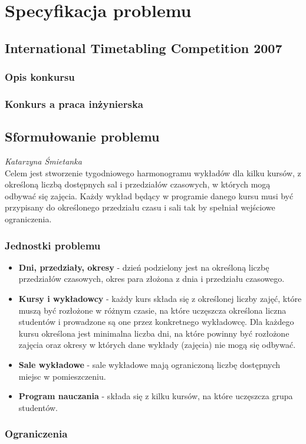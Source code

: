 \chapter{Specyfikacja problemu}
\section{International Timetabling Competition 2007}
\subsection{Opis konkursu}
\subsection{Konkurs a praca inżynierska}
\section{Sformułowanie problemu}
\textit{Katarzyna Śmietanka} \\
Celem jest stworzenie tygodniowego harmonogramu wykładów dla kilku kursów, z określoną liczbą dostępnych sal i przedziałów czasowych, w których mogą odbywać się zajęcia. Każdy wykład będący w programie danego kursu musi być przypisany do określonego przedziału czasu i sali tak by spełniał wejściowe ograniczenia. 
\subsection{Jednostki problemu}
\begin{itemize}
\item{\textbf{Dni, przedziały, okresy} - dzień podzielony jest na określoną liczbę przedziałów czasowych, okres para złożona z dnia i przedziału czasowego.}
\item{\textbf{Kursy i wykładowcy} - każdy kurs składa się z określonej liczby zajęć, które muszą być rozłożone w różnym czasie, na które uczęszcza określona liczna studentów i prowadzone są one przez konkretnego wykładowcę. Dla każdego kursu określona jest minimalna liczba dni, na które powinny być rozłożone zajęcia oraz okresy w których dane wykłady (zajęcia) nie mogą się odbywać.}
\item{\textbf{Sale wykładowe} - sale wykładowe mają ograniczoną liczbę dostępnych miejsc w pomieszczeniu.}
\item{\textbf{Program nauczania} - składa się z kilku kursów, na które uczęszcza grupa studentów.}
\end{itemize}
\subsection{Ograniczenia}
